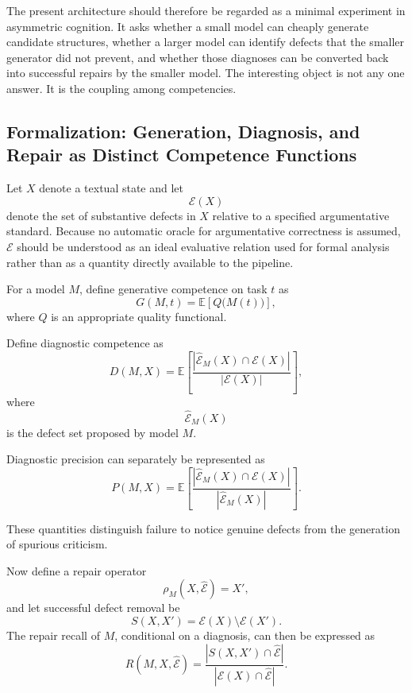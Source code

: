 \documentclass[11pt]{article}
\begin{document}
The present architecture should therefore be regarded as a minimal experiment in asymmetric cognition. It asks whether a small model can cheaply generate candidate structures, whether a larger model can identify defects that the smaller generator did not prevent, and whether those diagnoses can be converted back into successful repairs by the smaller model. The interesting object is not any one answer. It is the coupling among competencies.

\subsection{Formalization: Generation, Diagnosis, and Repair as Distinct Competence Functions}

Let \(X\) denote a textual state and let
\[
    \mathcal{E}(X)
\]
denote the set of substantive defects in \(X\) relative to a specified argumentative standard. Because no automatic oracle for argumentative correctness is assumed, \(\mathcal{E}\) should be understood as an ideal evaluative relation used for formal analysis rather than as a quantity directly available to the pipeline.

For a model \(M\), define generative competence on task \(t\) as
\[
    G(M,t)
    =
    \mathbb{E}
    \left[
        Q\bigl(M(t)\bigr)
    \right],
\]
where \(Q\) is an appropriate quality functional.

Define diagnostic competence as
\[
    D(M,X)
    =
    \mathbb{E}
    \left[
        \frac{
            |\widehat{\mathcal{E}}_M(X)\cap\mathcal{E}(X)|
        }{
            |\mathcal{E}(X)|
        }
    \right],
\]
where
\[
    \widehat{\mathcal{E}}_M(X)
\]
is the defect set proposed by model \(M\).

Diagnostic precision can separately be represented as
\[
    P(M,X)
    =
    \mathbb{E}
    \left[
        \frac{
            |\widehat{\mathcal{E}}_M(X)\cap\mathcal{E}(X)|
        }{
            |\widehat{\mathcal{E}}_M(X)|
        }
    \right].
\]

These quantities distinguish failure to notice genuine defects from the generation of spurious criticism.

Now define a repair operator
\[
    \rho_M(X,\widehat{\mathcal{E}})
    =
    X',
\]
and let successful defect removal be
\[
    S(X,X')
    =
    \mathcal{E}(X)\setminus\mathcal{E}(X').
\]
The repair recall of \(M\), conditional on a diagnosis, can then be expressed as
\[
    R(M,X,\widehat{\mathcal{E}})
    =
    \frac{
        |S(X,X')\cap\widehat{\mathcal{E}}|
    }{
        |\mathcal{E}(X)\cap\widehat{\mathcal{E}}|
    }.
\]
\end{document}
